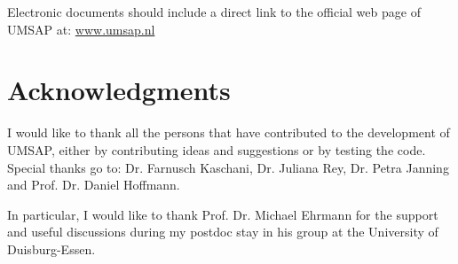 \newpage

Electronic documents should include a direct link to the official web page of UMSAP at: \href{https://www.umsap.nl}{www.umsap.nl}

\section{Acknowledgments}

I would like to thank all the persons that have contributed to the development of UMSAP, either by contributing ideas and suggestions or by testing the code. Special thanks go to: Dr. Farnusch Kaschani, Dr. Juliana Rey, Dr. Petra Janning and Prof. Dr. Daniel Hoffmann.

In particular, I would like to thank Prof. Dr. Michael Ehrmann for the support and useful discussions during my postdoc stay in his group at the University of Duisburg-Essen.

